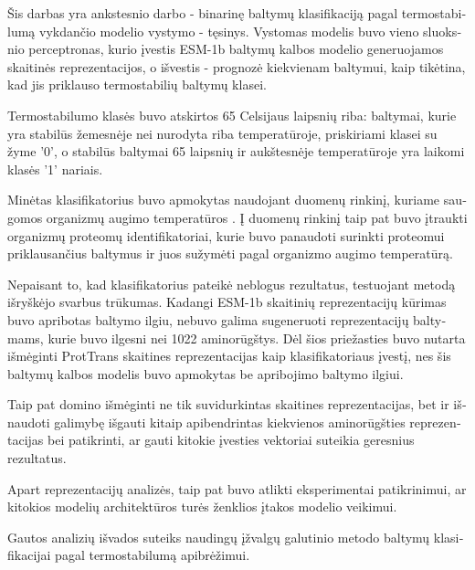 \documentclass[12pt]{article}
\begin{document}
	\begin{otherlanguage}{lithuanian}
	
    Šis darbas yra ankstesnio darbo - binarinę baltymų klasifikaciją 
    pagal termostabilumą vykdančio modelio vystymo - tęsinys. Vystomas
    modelis buvo vieno sluoksnio perceptronas, kurio įvestis ESM-1b 
	\cite{rives2021biological}
    baltymų kalbos modelio generuojamos skaitinės reprezentacijos, o
    išvestis - prognozė kiekvienam baltymui, kaip tikėtina, kad jis 
    priklauso termostabilių baltymų klasei.
    
    Termostabilumo klasės buvo atskirtos 65 Celsijaus laipsnių riba:
    baltymai, kurie yra stabilūs žemesnėje nei nurodyta riba 
    temperatūroje, priskiriami klasei su žyme '0', o stabilūs 
    baltymai 65 laipsnių ir aukštesnėje temperatūroje yra 
    laikomi klasės '1' nariais.
    
    Minėtas klasifikatorius buvo apmokytas naudojant duomenų rinkinį, 
	kuriame
    saugomos organizmų augimo temperatūros 
	\cite{engqvist_martin_karl_magnus_2018_1175609}. Į duomenų rinkinį 
	taip pat
    buvo įtraukti organizmų proteomų identifikatoriai, kurie buvo
    panaudoti surinkti proteomui priklausančius baltymus ir juos 
    sužymėti pagal organizmo augimo temperatūrą.

    Nepaisant to, kad klasifikatorius pateikė neblogus rezultatus,
    testuojant metodą išryškėjo svarbus trūkumas. Kadangi ESM-1b
    skaitinių reprezentacijų kūrimas buvo apribotas baltymo ilgiu,
    nebuvo galima sugeneruoti reprezentacijų baltymams, kurie buvo 
    ilgesni nei 1022 aminorūgštys. Dėl šios priežasties buvo nutarta
    išmėginti ProtTrans \cite{elnaggar2020prottrans} skaitines 
	reprezentacijas kaip klasifikatoriaus
    įvestį, nes šis baltymų kalbos modelis buvo apmokytas be apribojimo 
    baltymo ilgiui. 

    Taip pat domino išmėginti ne tik suvidurkintas skaitines 
    reprezentacijas, bet ir išnaudoti galimybę išgauti kitaip
    apibendrintas kiekvienos aminorūgšties reprezentacijas bei 
    patikrinti, ar gauti kitokie įvesties vektoriai suteikia
    geresnius rezultatus. 
  
    Apart reprezentacijų analizės, taip pat buvo atlikti 
	eksperimentai
    patikrinimui, ar kitokios modelių architektūros turės
    ženklios įtakos modelio veikimui.
      
    Gautos analizių išvados suteiks naudingų įžvalgų galutinio
    metodo baltymų klasifikacijai pagal termostabilumą apibrėžimui.

	\end{otherlanguage}
	
\end{document}
